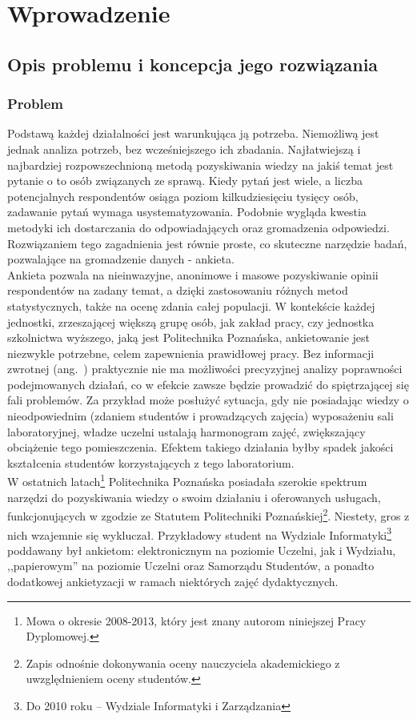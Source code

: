 \chapter{Wprowadzenie}
\label{Chapter1}

\section{Opis problemu i koncepcja jego rozwiązania}
\label{Chapter11}

\subsection{Problem}
\label{Chapter111}

Podstawą każdej działalności jest warunkująca ją potrzeba. Niemożliwą jest jednak analiza potrzeb, bez wcześniejszego ich zbadania. Najłatwiejszą i najbardziej rozpowszechnioną metodą pozyskiwania wiedzy na jakiś temat jest pytanie o to osób związanych ze sprawą. Kiedy pytań jest wiele, a liczba potencjalnych respondentów osiąga poziom kilkudziesięciu tysięcy osób, zadawanie pytań wymaga usystematyzowania. Podobnie wygląda kwestia metodyki ich dostarczania do odpowiadających oraz gromadzenia odpowiedzi. Rozwiązaniem tego zagadnienia jest równie proste, co skuteczne narzędzie badań, pozwalające na gromadzenie danych - ankieta. \\

Ankieta pozwala na nieinwazyjne, anonimowe i masowe pozyskiwanie opinii respondentów na zadany temat, a dzięki zastosowaniu różnych metod statystycznych, także na ocenę zdania całej populacji. W kontekście każdej jednostki, zrzeszającej większą grupę osób, jak zakład pracy, czy jednostka szkolnictwa wyższego, jaką jest Politechnika Poznańska, ankietowanie jest niezwykle potrzebne, celem zapewnienia prawidłowej pracy. Bez informacji zwrotnej (ang.~) praktycznie nie ma możliwości precyzyjnej analizy poprawności podejmowanych działań, co w efekcie zawsze będzie prowadzić do spiętrzającej się fali problemów. Za przykład może posłużyć sytuacja, gdy nie posiadając wiedzy o nieodpowiednim (zdaniem studentów i prowadzących zajęcia) wyposażeniu sali laboratoryjnej, władze uczelni ustalają harmonogram zajęć, zwiększający obciążenie tego pomieszczenia. Efektem takiego działania byłby spadek jakości kształcenia studentów korzystających z tego laboratorium. \\

W ostatnich latach\footnote{Mowa o okresie 2008-2013, który jest znany autorom niniejszej Pracy Dyplomowej.} Politechnika Poznańska posiadała szerokie spektrum narzędzi do pozyskiwania wiedzy o swoim działaniu i oferowanych usługach, funkcjonujących w zgodzie ze Statutem Politechniki Poznańskiej\footnote{Zapis odnośnie dokonywania oceny nauczyciela akademickiego z uwzględnieniem oceny studentów\cite{AP:SPP11}.}. Niestety, gros z nich wzajemnie się wykluczał. Przykładowy student na Wydziale Informatyki\footnote{Do 2010 roku -- Wydziale Informatyki i Zarządzania} poddawany był ankietom: elektronicznym na poziomie Uczelni, jak i Wydziału, ,,papierowym'' na poziomie Uczelni oraz Samorządu Studentów, a ponadto dodatkowej ankietyzacji w ramach niektórych zajęć dydaktycznych. \\

